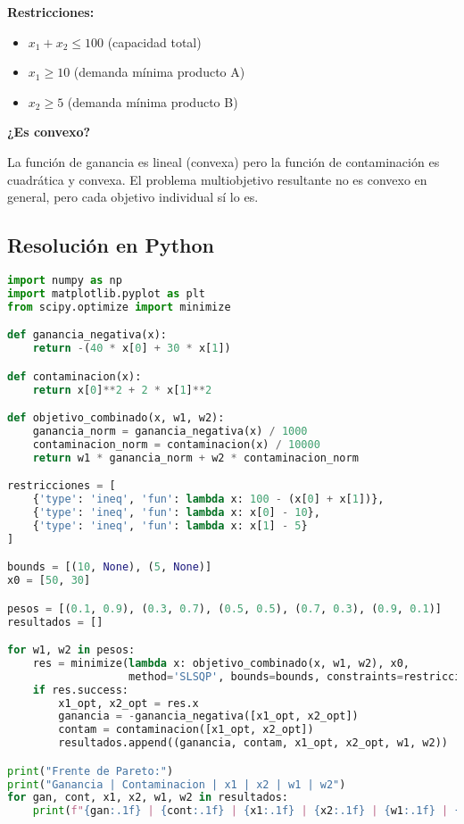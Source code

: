 \documentclass[12pt]{article}
\begin{document}
\textbf{Restricciones:}
\begin{itemize}
    \item $x_1 + x_2 \leq 100$ (capacidad total)
    \item $x_1 \geq 10$ (demanda mínima producto A)
    \item $x_2 \geq 5$ (demanda mínima producto B)
\end{itemize}

\vspace{0.3em}

\textbf{¿Es convexo?}

\vspace{0.3em}

La función de ganancia es lineal (convexa) pero la función de contaminación es cuadrática y convexa. El problema multiobjetivo resultante no es convexo en general, pero cada objetivo individual sí lo es.

\subsection{Resolución en Python}

\begin{lstlisting}[language=Python]
import numpy as np
import matplotlib.pyplot as plt
from scipy.optimize import minimize

def ganancia_negativa(x):
    return -(40 * x[0] + 30 * x[1])

def contaminacion(x):
    return x[0]**2 + 2 * x[1]**2

def objetivo_combinado(x, w1, w2):
    ganancia_norm = ganancia_negativa(x) / 1000
    contaminacion_norm = contaminacion(x) / 10000
    return w1 * ganancia_norm + w2 * contaminacion_norm

restricciones = [
    {'type': 'ineq', 'fun': lambda x: 100 - (x[0] + x[1])},
    {'type': 'ineq', 'fun': lambda x: x[0] - 10},
    {'type': 'ineq', 'fun': lambda x: x[1] - 5}
]

bounds = [(10, None), (5, None)]
x0 = [50, 30]

pesos = [(0.1, 0.9), (0.3, 0.7), (0.5, 0.5), (0.7, 0.3), (0.9, 0.1)]
resultados = []

for w1, w2 in pesos:
    res = minimize(lambda x: objetivo_combinado(x, w1, w2), x0, 
                   method='SLSQP', bounds=bounds, constraints=restricciones)
    if res.success:
        x1_opt, x2_opt = res.x
        ganancia = -ganancia_negativa([x1_opt, x2_opt])
        contam = contaminacion([x1_opt, x2_opt])
        resultados.append((ganancia, contam, x1_opt, x2_opt, w1, w2))

print("Frente de Pareto:")
print("Ganancia | Contaminacion | x1 | x2 | w1 | w2")
for gan, cont, x1, x2, w1, w2 in resultados:
    print(f"{gan:.1f} | {cont:.1f} | {x1:.1f} | {x2:.1f} | {w1:.1f} | {w2:.1f}")
\end{lstlisting}
\end{document}
